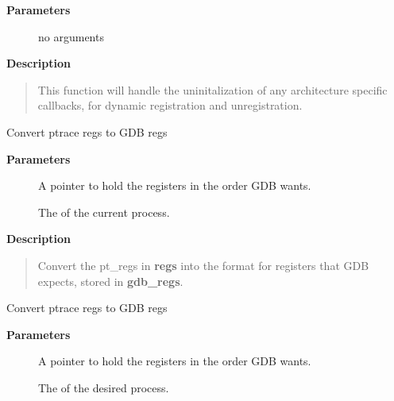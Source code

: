 \documentclass[a4paper,8pt,english]{sphinxmanual}
\begin{document}
\textbf{Parameters}
\begin{description}
\item[{}] \leavevmode
no arguments

\end{description}

\textbf{Description}
\begin{quote}

This function will handle the uninitalization of any architecture
specific callbacks, for dynamic registration and unregistration.
\end{quote}

\begin{fulllineitems}
\label{dev-tools/kgdb:c.pt_regs_to_gdb_regs}
Convert ptrace regs to GDB regs

\end{fulllineitems}


\textbf{Parameters}
\begin{description}
\item[{}] \leavevmode
A pointer to hold the registers in the order GDB wants.

\item[{}] \leavevmode
The  of the current process.

\end{description}

\textbf{Description}
\begin{quote}

Convert the pt\_regs in \textbf{regs} into the format for registers that
GDB expects, stored in \textbf{gdb\_regs}.
\end{quote}

\begin{fulllineitems}
\label{dev-tools/kgdb:c.sleeping_thread_to_gdb_regs}
Convert ptrace regs to GDB regs

\end{fulllineitems}


\textbf{Parameters}
\begin{description}
\item[{}] \leavevmode
A pointer to hold the registers in the order GDB wants.

\item[{}] \leavevmode
The  of the desired process.

\end{description}
\end{document}
